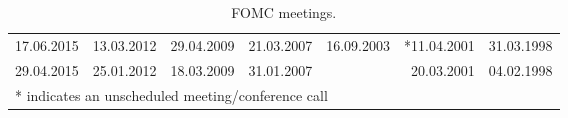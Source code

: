 \documentclass[11pt,a4paper,english,oneside]{book}
\numberwithin{equation}{chapter}
\begin{document}
\begin{table}[h]
\begin{tabular}{r r r r r r r }
						17.06.2015 & 13.03.2012 & 29.04.2009 & 21.03.2007 & 16.09.2003 & *11.04.2001 & 31.03.1998 \\
						29.04.2015 & 25.01.2012 & 18.03.2009 & 31.01.2007 &  & 20.03.2001 & 04.02.1998 \\
						\midrule																
						\multicolumn{6}{l}{* indicates an unscheduled meeting/conference call} & \\
		\bottomrule %
	\end{tabular}
	\caption{FOMC meetings.} %
	\label{tab:meetings} %
\end{table}




\newpage
\thispagestyle{empty}
\end{document}
